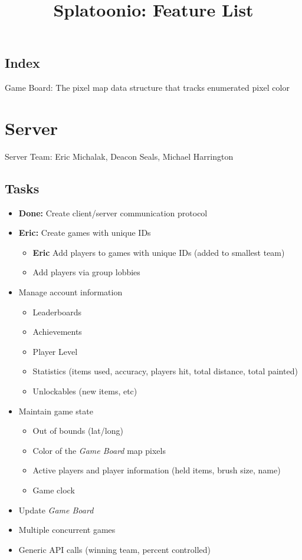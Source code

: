 \documentclass{article}
\title{Splatoonio: Feature List}
\author{}
\date{\vspace{-5ex}} %
\begin{document}
\maketitle
\tableofcontents

\subsection*{Index}
Game Board: The pixel map data structure that tracks enumerated pixel color

\newpage
\section{Server}
Server Team: Eric Michalak, Deacon Seals, Michael Harrington
\subsection{Tasks}
\begin{itemize}
\item \textbf{Done:} Create client/server communication protocol
\item \textbf{Eric:} Create games with unique IDs
\begin{itemize}
	\item \textbf{Eric} Add players to games with unique IDs (added to smallest team)
	\item Add players via group lobbies
\end{itemize}
\item Manage account information
	\begin{itemize}
	\item Leaderboards
    \item Achievements
    \item Player Level
    \item Statistics (items used, accuracy, players hit, total distance, total painted)
    \item Unlockables (new items, etc)
	\end{itemize}
\item Maintain game state
	\begin{itemize}
	\item Out of bounds (lat/long)
    \item Color of the \emph{Game Board} map pixels
    \item Active players and player information (held items, brush size, name)
    \item Game clock
	\end{itemize}
\item Update \emph{Game Board}
\item Multiple concurrent games
\item Generic API calls (winning team, percent controlled)
\end{itemize}
\end{document}
